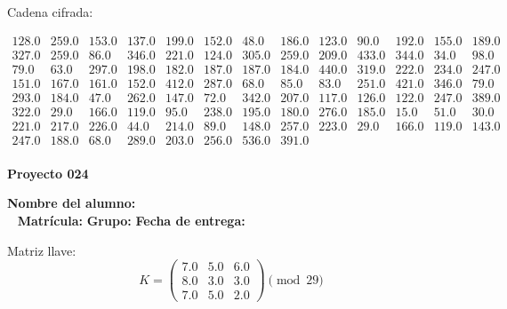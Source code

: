 \documentclass[12pt]{article}
\begin{document}
Cadena cifrada:
\begin{center}
$\begin{array}{lllllllllllll}
128.0 & 259.0 & 153.0 & 137.0 & 199.0 & 152.0 & 48.0 & 186.0 & 123.0 & 90.0 & 192.0 & 155.0 & 189.0\\
327.0 & 259.0 & 86.0 & 346.0 & 221.0 & 124.0 & 305.0 & 259.0 & 209.0 & 433.0 & 344.0 & 34.0 & 98.0\\
79.0 & 63.0 & 297.0 & 198.0 & 182.0 & 187.0 & 187.0 & 184.0 & 440.0 & 319.0 & 222.0 & 234.0 & 247.0\\
151.0 & 167.0 & 161.0 & 152.0 & 412.0 & 287.0 & 68.0 & 85.0 & 83.0 & 251.0 & 421.0 & 346.0 & 79.0\\
293.0 & 184.0 & 47.0 & 262.0 & 147.0 & 72.0 & 342.0 & 207.0 & 117.0 & 126.0 & 122.0 & 247.0 & 389.0\\
322.0 & 29.0 & 166.0 & 119.0 & 95.0 & 238.0 & 195.0 & 180.0 & 276.0 & 185.0 & 15.0 & 51.0 & 30.0\\
221.0 & 217.0 & 226.0 & 44.0 & 214.0 & 89.0 & 148.0 & 257.0 & 223.0 & 29.0 & 166.0 & 119.0 & 143.0\\
247.0 & 188.0 & 68.0 & 289.0 & 203.0 & 256.0 & 536.0 & 391.0\\
\end{array}$
\end{center}

\newpage


\textbf{Proyecto 024}

\textbf{Nombre del alumno:} \underline{\hspace{13cm}}\\\
\vspace{1cm}
\textbf{Matrícula:} \underline{\hspace{4cm}} \hspace{1cm}
\textbf{Grupo:} \underline{\hspace{2cm}}
\textbf{Fecha de entrega:} \underline{\hspace{2cm}}

\medskip

Matriz llave:
\[
K = \begin{pmatrix}
7.0 & 5.0 & 6.0\\
8.0 & 3.0 & 3.0\\
7.0 & 5.0 & 2.0
\end{pmatrix} \pmod{29}
\]
\end{document}
